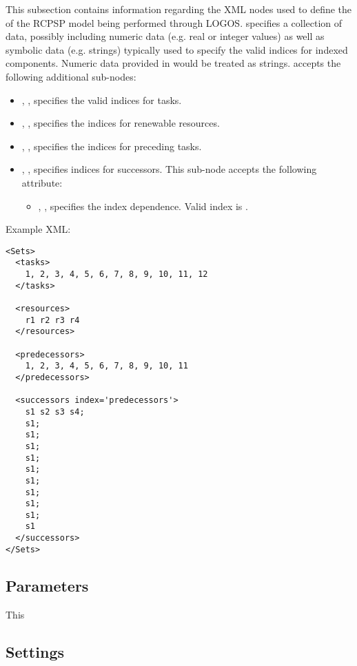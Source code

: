 This subsection contains information regarding the XML nodes used to define the
 of the RCPSP model being performed through LOGOS.
 specifies a collection of data, possibly including
numeric data (e.g. real or integer values) as well as symbolic data (e.g. strings)
typically used to specify the valid indices for indexed components.
\nb Numeric data provided in  would be treated as strings.
 accepts the following additional sub-nodes:
\begin{itemize}
  \item {}, , specifies
  the valid indices for tasks.
  \item {}, ,
  specifies the indices for renewable resources.
  \item {}, ,
  specifies the indices for preceding tasks.
  \item {}, ,
  specifies indices for successors.
  This sub-node accepts the following attribute:
  \begin{itemize}
    \item {}, , specifies the index dependence.
    Valid index is .
  \end{itemize}
\end{itemize}

Example XML:
\begin{lstlisting}[style=XML]
<Sets>
  <tasks>
    1, 2, 3, 4, 5, 6, 7, 8, 9, 10, 11, 12
  </tasks>

  <resources>
    r1 r2 r3 r4
  </resources>

  <predecessors>
    1, 2, 3, 4, 5, 6, 7, 8, 9, 10, 11
  </predecessors>

  <successors index='predecessors'>
    s1 s2 s3 s4;
    s1;
    s1;
    s1;
    s1;
    s1;
    s1;
    s1;
    s1;
    s1;
    s1
  </successors>
</Sets>
\end{lstlisting}


\subsection{Parameters}
\label{subsec:rcpsp_params}

This

\subsection{Settings}
\label{subsec:rcpsp_settings}

